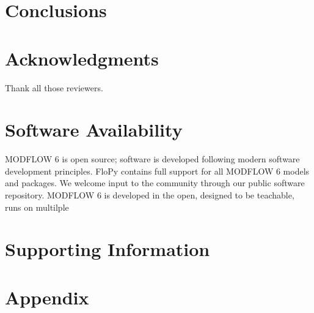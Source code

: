 \documentclass{article}
\begin{document}
\section{Conclusions}

\section{Acknowledgments}
Thank all those reviewers.

\section{Software Availability}
MODFLOW 6 is open source; software is developed following modern software development principles.  FloPy \citep{bakker2016scripting} contains full support for all MODFLOW 6 models and packages.  We welcome input to the community through our public software repository.  MODFLOW 6 is developed in the open, designed to be teachable, runs on multilple

\section{Supporting Information}

\section{Appendix}


\end{document}

